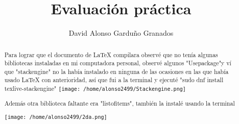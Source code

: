 \documentclass[]{article}
\title{Evaluación práctica}
\author{David Alonso Garduño Granados}
\begin{document}
\maketitle

\begin{abstract}
Para lograr que el documento de LaTeX compilara observé que no tenía algunas bibliotecas instaladas en mi computadora personal, observé algunos "Usepackage"y ví que "stackengine" no la había instalado en ninguna de las ocasiones en las que había usado LaTeX con anterioridad, así que fui a la terminal y ejecuté "sudo dnf install texlive-stackengine"
\texttt{[image: /home/alonso2499/Stackengine.png]}

Además otra biblioteca faltante era "listofitems", también la instalé usando la terminal

\texttt{[image: /home/alonso2499/2da.png]}
\end{abstract}
\end{document}
